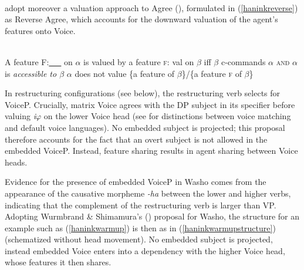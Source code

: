 \documentclass[output=paper]{langscibook}
\begin{document}
 \ea \label{haninkvoice3}\

\vspace{-1em}\hspace{0em}

\z 

\vspace{-1em}
\cite{WurmbrandShimamura2017}  adopt moreover a valuation approach to Agree (\citealt{pesetskytorrego2007}), formulated in (\ref{haninkreverse}) as Reverse Agree, which accounts for the downward valuation of the agent's features onto Voice.

 \citep{Wurmbrand2014}\label{haninkreverse}\\
A feature {\scshape F}:\underline{\ \ \ } on $\alpha$ is valued by a feature {\scshape f}: val on $\beta$ iff 
\ea $\beta$ c-commands $\alpha$ {\scshape and}
\ex $\alpha$ is {\itshape accessible to $\beta$}
\ex $\alpha$ does not value \{a feature of $\beta$\}/\{a feature {\scshape f} of $\beta$\}
\z
\z


In restructuring configurations (see below), the restructuring verb selects for VoiceP.  Crucially, matrix Voice agrees with the DP subject in its specifier before valuing {\itshape i}$\varphi$ on the lower Voice head (see \citealt{wurmbrand2015,WurmbrandShimamura2017} for distinctions between voice matching and default voice languages). No embedded subject is projected; this proposal therefore accounts for the fact that an overt subject is not allowed in the embedded VoiceP. Instead, feature sharing results in agent sharing between Voice heads. 


Evidence for the presence of embedded VoiceP in Washo  comes from the appearance of the causative morpheme {\itshape -ha} between the lower and higher verbs, indicating that the complement of the restructuring verb is larger than VP. Adopting  Wurmbrand \& Shimamura's (\citeyear{WurmbrandShimamura2017}) proposal for Washo, the structure for an example such as (\ref{haninkwarmup}) is then as in (\ref{haninkwarmupstructure}) (schematized without head movement). No embedded subject is projected, instead embedded Voice enters into a dependency with the higher Voice head, whose features it then shares.
 
\end{document}
